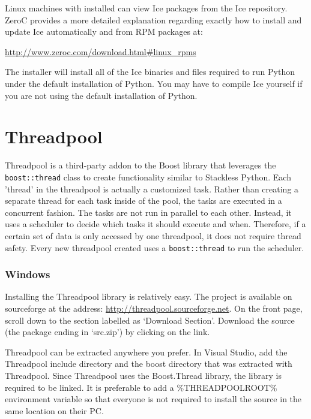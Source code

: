Linux machines with  installed can view Ice packages from the Ice repository. ZeroC provides a more detailed explanation regarding exactly how to install and update Ice automatically and from RPM packages at:

\url{http://www.zeroc.com/download.html\#linux\_rpms}

The  installer will install all of the Ice binaries and files required to run Python under the default installation of Python. You may have to compile Ice yourself if you are not using the default installation of Python.

\section{Threadpool}

Threadpool is a third-party addon to the Boost library that leverages the \lstinline!boost::thread! class to create functionality similar to Stackless Python. Each 'thread' in the threadpool is actually a customized task. Rather than creating a separate thread for each task inside of the pool, the tasks are executed in a concurrent fashion. The tasks are not run in parallel to each other. Instead, it uses a scheduler to decide which tasks it should execute and when. Therefore, if a certain set of data is only accessed by one threadpool, it does not require thread safety. Every new threadpool created uses a \lstinline!boost::thread! to run the scheduler.

\subsubsection*{Windows}

Installing the Threadpool library is relatively easy. The project is available on sourceforge at the address: \url{http://threadpool.sourceforge.net}. On the front page, scroll down to the section labelled as `Download Section'. Download the source (the package ending in `src.zip') by clicking on the link.

Threadpool can be extracted anywhere you prefer. In Visual Studio, add the Threadpool include directory and the boost directory that was extracted with Threadpool. Since Threadpool uses the Boost.Thread library, the  library is required to be linked. It is preferable to add a \%THREADPOOLROOT\% environment variable so that everyone is not required to install the source in the same location on their PC.

